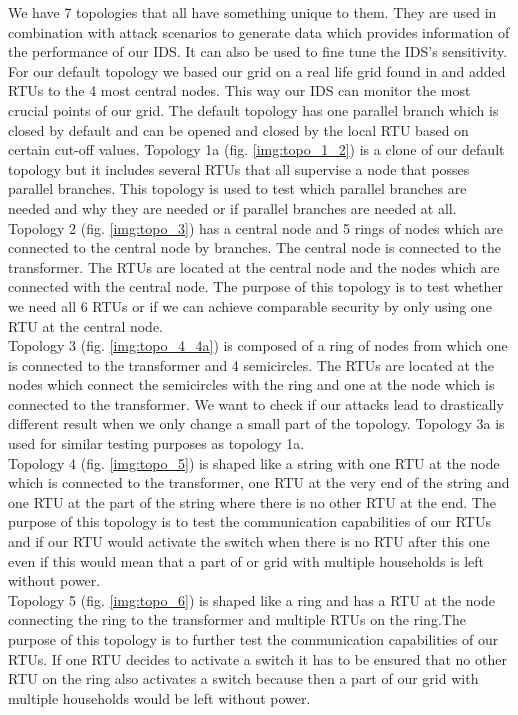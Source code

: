 \documentclass[conference]{IEEEtran}
\begin{document}
		We have 7 topologies that all have something unique to them. They are used in combination with attack scenarios to generate data which provides information of the performance of our IDS. It can also be used to fine tune the IDS’s sensitivity. For our default topology we based our grid on a real life grid found in \cite{chromik1} and added RTUs to the 4 most central nodes. This way our IDS can monitor the most crucial points of our grid. The default topology has one parallel	branch which is closed by default and can be opened and closed by the local RTU based on
		certain cut-off values.
		Topology 1a (fig. \ref{img:topo_1_2}) is a clone of our default topology but it includes several RTUs that all supervise a node that posses parallel branches. This topology is used to test which parallel branches are needed and why they are needed or if parallel branches are needed at all. \\
		Topology 2 (fig. \ref{img:topo_3}) has a central node and 5 rings of nodes which are connected to the
		central node by branches. The central node is connected to the transformer. The RTUs are located at the central node and the nodes which are connected with the central node. The purpose of this topology is to test whether we need all 6 RTUs or if we can achieve comparable security by only using one RTU at the central node. \\
		Topology 3 (fig. \ref{img:topo_4_4a}) is composed of a ring of nodes from which one is connected to the	transformer and 4 semicircles. The RTUs are located at the nodes which connect the semicircles with the ring and one at the node which is connected to the transformer. We want to check if our attacks lead to drastically different result when we only change a small part of the topology. Topology 3a is used for similar testing purposes as topology 1a. \\
		Topology 4 (fig. \ref{img:topo_5}) is shaped like a string with one RTU at the node which is connected to the transformer, one RTU at the very end of the string and one RTU at the part of the string where there is no other RTU at the end. The purpose of this topology is to test the communication capabilities of our RTUs and if our RTU would activate the switch when there is no RTU after this one even if this would mean that a part of or grid with multiple households is left without power. \\
		Topology 5 (fig. \ref{img:topo_6}) is shaped like a ring and has a RTU at the node	connecting the ring to the transformer and multiple RTUs on the ring.The purpose of this topology is to further test the communication capabilities of our RTUs. If one RTU decides to
		activate a switch it has to be ensured that no other RTU on the ring also activates a switch because then a part of our grid with multiple households would be left without power.
\end{document}
